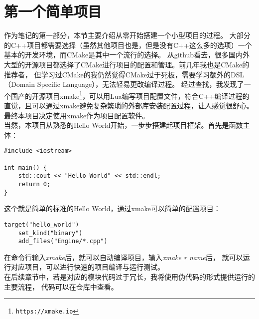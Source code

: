 \section{第一个简单项目}
作为笔记的第一部分，本节主要介绍从零开始搭建一个小型项目的过程。
大部分的C++项目都需要选择（虽然其他项目也是，但是没有C++这么多的选项）一个基本的开发环境，而CMake是其中一个流行的选择。
从github看去，很多国内外大型的开源项目都选择了CMake进行项目的配置和管理。前几年我也是CMake的推荐者，
但学习过CMake的我仍然觉得CMake过于死板，需要学习额外的DSL（Domain Specific Language），无法轻易更改编译过程。
经过查找，我发现了一个国产的开源项目xmake\footnote{\nolinkurl{https://xmake.io}}，可以用Lua编写项目配置文件，符合C++编译过程的直觉，且可以通过xmake避免复杂繁琐的外部库安装配置过程，让人感觉很舒心。
最终本项目决定使用xmake作为项目配置软件。\\

当然，本项目从熟悉的Hello World开始，一步步搭建起项目框架。首先是函数主体：\\

\begin{lstlisting}[style=C++,title={Engine/main.cpp}]
#include <iostream>

int main() {
    std::cout << "Hello World" << std::endl;
    return 0;
}
\end{lstlisting}

% 
% 

这个就是简单的标准的Hello World，通过xmake可以简单的配置项目：\\


\begin{lstlisting}[style=Lua,title={xmake.lua}]
target("hello_world")
    set_kind("binary")
    add_files("Engine/*.cpp")
\end{lstlisting}

在命令行输入\emph{xmake}后，就可以自动编译项目，输入\emph{xmake r name}后，
就可以运行对应项目，可以进行快速的项目编译与运行测试。\\

在后续章节中，若是对应的模块代码过于冗长，我将使用伪代码的形式提供运行的主要流程，
代码可以在仓库中查看。
